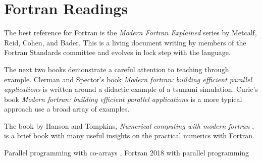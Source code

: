 % 

\section{Fortran Readings}
The best reference for Fortran is the \emph{Modern Fortran Explained} series \cite{metcalf2024modern} by Metcalf, Reid, Cohen, and Bader. This is a living document writing by members of the Fortran Standards committee and evolves in lock step with the language.

The next two books demonstrate a careful attention to teaching through example. Clerman and Spector's book \emph{Modern fortran: building efficient parallel applications} \cite{clerman2011modern} is written around a didactic example of a tsunami simulation. Curic's book \emph{Modern fortran: building efficient parallel applications}  \cite{curcic2020modern} is a more typical approach use a broad array of examples.

The book by Hanson and Tompkins, \emph{Numerical computing with modern fortran} \cite{Hanson2013}, is a brief book with many useful insights on the practical numerics with Fortran.

Parallel programming with co-arrays \cite{numrich2018parallel}, Fortran 2018 with parallel programming \cite{ray2019fortran}

\endinput  %
